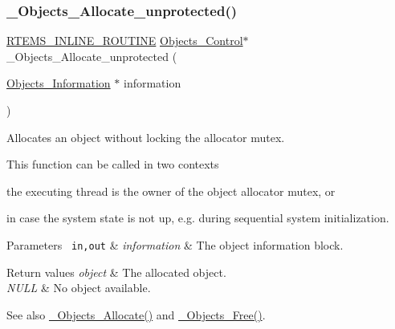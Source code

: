 \subsubsection{\texorpdfstring{\_Objects\_Allocate\_unprotected()}{\_Objects\_Allocate\_unprotected()}}
{\footnotesize\ttfamily \mbox{\hyperlink{group__RTEMSScoreBaseDefs_gac216239df231d5dbd15e3520b0b9313f}{R\+T\+E\+M\+S\+\_\+\+I\+N\+L\+I\+N\+E\+\_\+\+R\+O\+U\+T\+I\+NE}} \mbox{\hyperlink{structObjects__Control}{Objects\+\_\+\+Control}}$\ast$ \+\_\+\+Objects\+\_\+\+Allocate\+\_\+unprotected (\begin{DoxyParamCaption}\item[{\mbox{\hyperlink{structObjects__Information}{Objects\+\_\+\+Information}} $\ast$}]{information }\end{DoxyParamCaption})}



Allocates an object without locking the allocator mutex. 

This function can be called in two contexts
\begin{DoxyItemize}
\item the executing thread is the owner of the object allocator mutex, or
\item in case the system state is not up, e.\+g. during sequential system initialization.
\end{DoxyItemize}


\begin{DoxyParams}[1]{Parameters}
\mbox{\texttt{ in,out}}  & {\em information} & The object information block.\\
\hline
\end{DoxyParams}

\begin{DoxyRetVals}{Return values}
{\em object} & The allocated object. \\
\hline
{\em N\+U\+LL} & No object available.\\
\hline
\end{DoxyRetVals}
\begin{DoxySeeAlso}{See also}
\mbox{\hyperlink{group__RTEMSScoreObject_ga3978b5150ea104a85bb28db0585ae000}{\+\_\+\+Objects\+\_\+\+Allocate()}} and \mbox{\hyperlink{group__RTEMSScoreObject_ga2215dcf7e3251e6f629b6a3a96fff44e}{\+\_\+\+Objects\+\_\+\+Free()}}. 
\end{DoxySeeAlso}
\mbox{\label{group__RTEMSScoreObject_gaa0886867669718ead9e2a6f6616b40a0}} 
